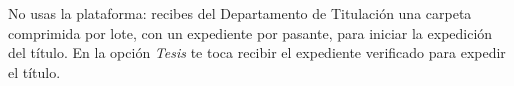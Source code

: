 \documentclass[11pt,a4paper]{article}
\begin{document}
{\small\tableofcontents}
\newpage
\begin{quevasahacer}
No usas la plataforma: recibes del Departamento de Titulación una carpeta comprimida por lote, con un expediente por pasante, para iniciar la expedición del título. En la opción \emph{Tesis} te toca recibir el expediente verificado para expedir el título.
\end{quevasahacer}



\end{document}
